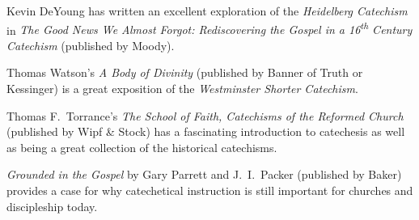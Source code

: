 \documentclass[00-main.tex]{subfiles}
\begin{document}
Kevin DeYoung has written an excellent exploration of the \emph{Heidelberg Catechism}\/ in \emph{The Good News We Almost Forgot: Rediscovering the Gospel\/ in a 16\textsuperscript{th} Century Catechism}\/ (published by Moody).

Thomas Watson's \emph{A Body of Divinity}\/ (published by Banner of Truth or Kessinger) is a great exposition of the \emph{Westminster Shorter Catechism}.

Thomas F.\ Torrance's \emph{The School of Faith, Catechisms of the Reformed Church}\/ (published by Wipf \& Stock) has a fascinating introduction to catechesis as well as being a great collection of the historical catechisms.

\emph{Grounded in the Gospel}\/ by Gary Parrett and J.~I.\ Packer (published by Baker) provides a case for why catechetical instruction is still important for churches and discipleship today.

\cleardoublepage
\end{document}
